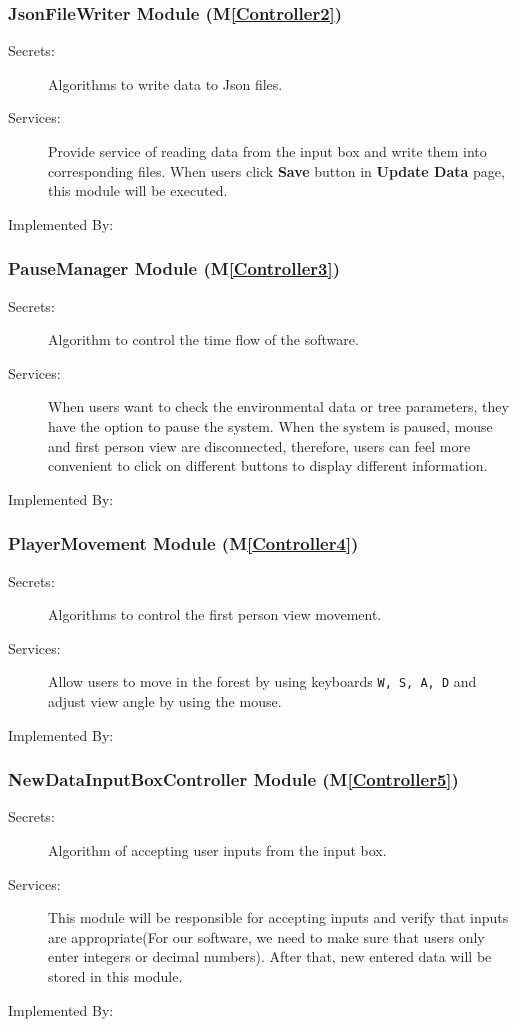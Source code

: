 \documentclass[12pt, titlepage]{article}
\newcommand{\mref}[1]{M\ref{#1}}
\begin{document}
\subsubsection{JsonFileWriter Module (\mref{Controller2})}
\begin{description}
\item[Secrets:] Algorithms to write data to Json files.
\item[Services:] Provide service of reading data from the input box and write them into 
corresponding files. When users click \textbf{Save} button in \textbf{Update Data} page, 
this module will be executed.
\item[Implemented By:] \progname{}
\end{description}

\subsubsection{PauseManager Module (\mref{Controller3})}
\begin{description}
\item[Secrets:] Algorithm to control the time flow of the software.
\item[Services:] When users want to check the environmental data or tree parameters, they
have the option to pause the system. When the system is paused, mouse and first person view
are disconnected, therefore, users can feel more convenient to click on different buttons
to display different information.  
\item[Implemented By:] \progname{}
\end{description}

\subsubsection{PlayerMovement Module (\mref{Controller4})}
\begin{description}
\item[Secrets:] Algorithms to control the first person view movement.
\item[Services:] Allow users to move in the forest by using keyboards \verb|W, S, A, D| and 
adjust view angle by using the mouse.
\item[Implemented By:] \progname{}
\end{description}

\subsubsection{NewDataInputBoxController Module (\mref{Controller5})}
\begin{description}
\item[Secrets:] Algorithm of accepting user inputs from the input box.
\item[Services:] This module will be responsible for accepting inputs and verify that inputs
are appropriate(For our software, we need to make sure that users only enter integers or
decimal numbers). After that, new entered data will be stored in this module.
\item[Implemented By:] \progname{}
\end{description}
\end{document}
